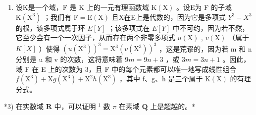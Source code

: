 \begin{enumerate}
\def\labelenumi{\arabic{enumi})}
\setcounter{enumi}{1}
\tightlist
\item
  设K是一个域，F 是 K 上的一元有理函数域 \(\mathrm{K}(\mathrm{X})\) 。设E为 F 的子域 \(\mathrm{K}(\mathrm{X}^{3})\) ；我们有 \(\mathrm{F} = \mathrm{E}(\mathrm{X})\) 且X在E上是代数的，因为它是多项式 \(Y^{3} - X^{3}\) 的根，该多项式属于环 \(E[Y]\) ；该多项式在 \(E[Y]\) 中不可约，因为若不然，它至少会有一个一次因子，从而存在两个非零多项式 \(u(\mathrm{X})\) , \(v(\mathrm{X})\) （属于 \(K[X]\) ）使得 \((u(\mathrm{X}^{3}))^{3} = \mathrm{X}^{3}(v(\mathrm{X}^{3}))^{3}\) ，这是荒谬的，因为若 m 和 n 分别是 u 和 v 的次数，这将意味着 \(9m = 9n + 3\) ，或 \(3m = 3n + 1\) 。因此，域 F 在 E 上的次数为 3，且 F 中的每个元素都可以唯一地写成线性组合 \(f(\mathrm{X}^{3}) + \mathrm{X}g(\mathrm{X}^{3}) + \mathrm{X}^{2}h(\mathrm{X}^{3})\) ，其中 f、g、h 是三个属于 \(\mathrm{K}(\mathrm{X})\) 的有理分式。
\end{enumerate}

*3) 在实数域 \(\mathbf{R}\) 中，可以证明 \(^1\) 数 \(\pi\) 在素域 \(\mathbf{Q}\) 上是超越的。*

